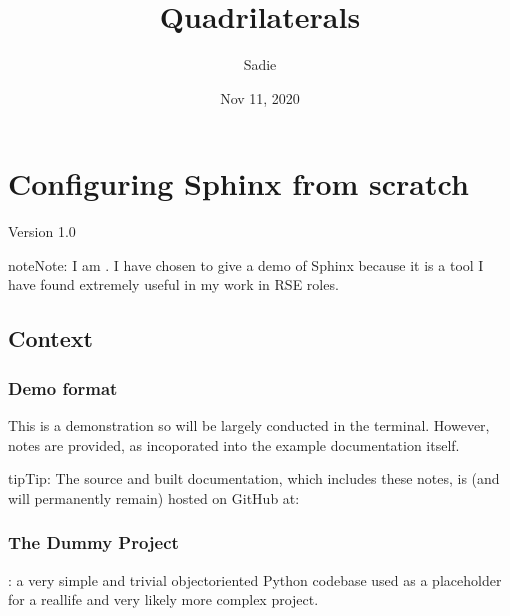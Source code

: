 \documentclass[letterpaper,10pt,english]{sphinxmanual}
\title{Quadrilaterals}
\date{Nov 11, 2020}
\author{Sadie}
\begin{document}
\pagestyle{empty}
\sphinxmaketitle
\pagestyle{plain}
\sphinxtableofcontents
\pagestyle{normal}
\label{\detokenize{index::doc}}



\chapter{Configuring Sphinx from scratch}
\label{\detokenize{context:configuring-sphinx-from-scratch}}\label{\detokenize{context::doc}}
Version 1.0


\begin{sphinxadmonition}{note}{Note:}
I am . I have chosen
to give a demo of Sphinx because it is a tool I have found extremely
useful in my work in RSE roles.
\end{sphinxadmonition}


\section{Context}
\label{\detokenize{context:context}}

\subsection{Demo format}
\label{\detokenize{context:demo-format}}
This is a demonstration so will be largely conducted in the terminal.
However, notes are provided, as incoporated into the example documentation
itself.

\begin{sphinxadmonition}{tip}{Tip:}
The source and built documentation, which includes these notes,
is (and will permanently remain) hosted on GitHub at:
\end{sphinxadmonition}


\subsection{The Dummy Project}
\label{\detokenize{context:the-dummy-project}}
: a very simple and trivial object\sphinxhyphen{}oriented Python codebase
used as a placeholder for a real\sphinxhyphen{}life and very likely more complex project.
\end{document}
